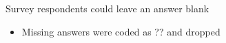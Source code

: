 \begin{frame}{Survey respondents could leave an answer blank}
  \begin{itemize}
    \item Missing answers were coded as ?? and dropped
  \end{itemize}
\end{frame}
